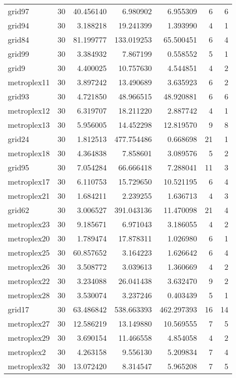 \begin{longtable}{|l|r|r|r|r|r|r|}
grid97 & 30 & 40.456140 & 6.980902 & 6.955309 & 6 & 6 \\
grid94 & 30 & 3.188218 & 19.241399 & 1.393990 & 4 & 1 \\
grid84 & 30 & 81.199777 & 133.019253 & 65.500451 & 6 & 4 \\
grid99 & 30 & 3.384932 & 7.867199 & 0.558552 & 5 & 1 \\
grid9 & 30 & 4.400025 & 10.757630 & 4.544851 & 4 & 2 \\
metroplex11 & 30 & 3.897242 & 13.490689 & 3.635923 & 6 & 2 \\
grid93 & 30 & 4.721850 & 48.966515 & 48.920881 & 6 & 6 \\
metroplex12 & 30 & 6.319707 & 18.211220 & 2.887742 & 4 & 1 \\
metroplex13 & 30 & 5.956005 & 14.452298 & 12.819570 & 9 & 8 \\
grid24 & 30 & 1.812513 & 477.754486 & 0.668698 & 21 & 1 \\
metroplex18 & 30 & 4.364838 & 7.858601 & 3.089576 & 5 & 2 \\
grid95 & 30 & 7.054284 & 66.666418 & 7.288041 & 11 & 3 \\
metroplex17 & 30 & 6.110753 & 15.729650 & 10.521195 & 6 & 4 \\
metroplex21 & 30 & 1.684211 & 2.239255 & 1.636713 & 4 & 3 \\
grid62 & 30 & 3.006527 & 391.043136 & 11.470098 & 21 & 4 \\
metroplex23 & 30 & 9.185671 & 6.971043 & 3.186055 & 4 & 2 \\
metroplex20 & 30 & 1.789474 & 17.878311 & 1.026980 & 6 & 1 \\
metroplex25 & 30 & 60.857652 & 3.164223 & 1.626642 & 6 & 4 \\
metroplex26 & 30 & 3.508772 & 3.039613 & 1.360669 & 4 & 2 \\
metroplex22 & 30 & 3.234088 & 26.041438 & 3.632470 & 9 & 2 \\
metroplex28 & 30 & 3.530074 & 3.237246 & 0.403439 & 5 & 1 \\
grid17 & 30 & 63.486842 & 538.663393 & 462.297393 & 16 & 14 \\
metroplex27 & 30 & 12.586219 & 13.149880 & 10.569555 & 7 & 5 \\
metroplex29 & 30 & 3.690154 & 11.466558 & 4.854058 & 4 & 2 \\
metroplex2 & 30 & 4.263158 & 9.556130 & 5.209834 & 7 & 4 \\
metroplex32 & 30 & 13.072420 & 8.314547 & 5.965208 & 7 & 5 \\

\end{longtable}
